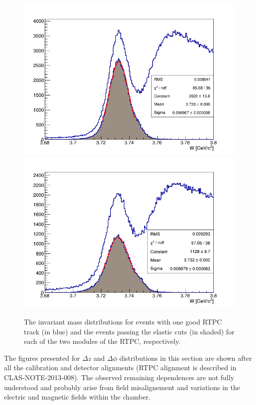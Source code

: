 \begin{figure}[tbp]
\includegraphics[scale=0.32]{fig_rtpc/fit_W_distribution_l.png}
\includegraphics[scale=0.32]{fig_rtpc/fit_W_distribution_r.png}
\caption[]{The invariant mass distributions for events with one good RTPC track (in blue) and the events passing the elastic cuts (in shaded) for each of the two modules of the RTPC, respectively.}
\label{fig:W_elastic}
\end{figure}

The figures presented for $\Delta z$ and $\Delta\phi$ distributions in this section are shown after all the
calibration and detector alignments (RTPC alignment is described in 
CLAS-NOTE-2013-008). The observed remaining dependences are not fully 
understood and probably arise from field misalignement and variations in the 
electric and magnetic fields within the chamber.


